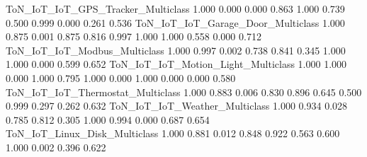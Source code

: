 ToN_IoT_IoT_GPS_Tracker_Multiclass                                         1.000            0.000                                    0.000                           0.863           1.000                    0.739                                                     0.500                                     0.999                                     0.000                              0.261   0.536
ToN_IoT_IoT_Garage_Door_Multiclass                                         1.000            0.875                                    0.001                           0.875           0.816                    0.997                                                     1.000                                     1.000                                     0.558                              0.000   0.712
ToN_IoT_IoT_Modbus_Multiclass                                              1.000            0.997                                    0.002                           0.738           0.841                    0.345                                                     1.000                                     1.000                                     0.000                              0.599   0.652
ToN_IoT_IoT_Motion_Light_Multiclass                                        1.000            1.000                                    0.000                           1.000           0.795                    1.000                                                     0.000                                     1.000                                     0.000                              0.000   0.580
ToN_IoT_IoT_Thermostat_Multiclass                                          1.000            0.883                                    0.006                           0.830           0.896                    0.645                                                     0.500                                     0.999                                     0.297                              0.262   0.632
ToN_IoT_IoT_Weather_Multiclass                                             1.000            0.934                                    0.028                           0.785           0.812                    0.305                                                     1.000                                     0.994                                     0.000                              0.687   0.654
ToN_IoT_Linux_Disk_Multiclass                                              1.000            0.881                                    0.012                           0.848           0.922                    0.563                                                     0.600                                     1.000                                     0.002                              0.396   0.622
